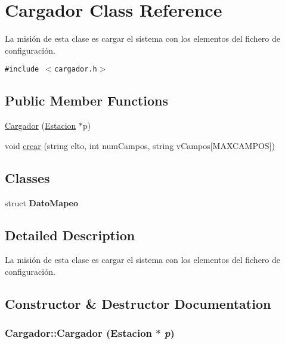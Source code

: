 \hypertarget{classCargador}{
\section{Cargador Class Reference}
\label{classCargador}
}
La misión de esta clase es cargar el sistema con los elementos del fichero de configuración.  


{\tt \#include $<$cargador.h$>$}

\subsection*{Public Member Functions}
\begin{CompactItemize}
\item 
\hyperlink{classCargador_4c12f282550e23654dcec70d837a0b7f}{Cargador} (\hyperlink{classEstacion}{Estacion} $\ast$p)
\item 
void \hyperlink{classCargador_60d8fe515f1ff623da7bcdd2d842e4fe}{crear} (string elto, int numCampos, string vCampos\mbox{[}MAXCAMPOS\mbox{]})
\end{CompactItemize}
\subsection*{Classes}
\begin{CompactItemize}
\item 
struct \textbf{DatoMapeo}
\end{CompactItemize}


\subsection{Detailed Description}
La misión de esta clase es cargar el sistema con los elementos del fichero de configuración. 

\subsection{Constructor \& Destructor Documentation}
\hypertarget{classCargador_4c12f282550e23654dcec70d837a0b7f}{
\subsubsection[Cargador]{\setlength{\rightskip}{0pt plus 5cm}Cargador::Cargador ({\bf Estacion} $\ast$ {\em p})}}
\label{classCargador_4c12f282550e23654dcec70d837a0b7f}


